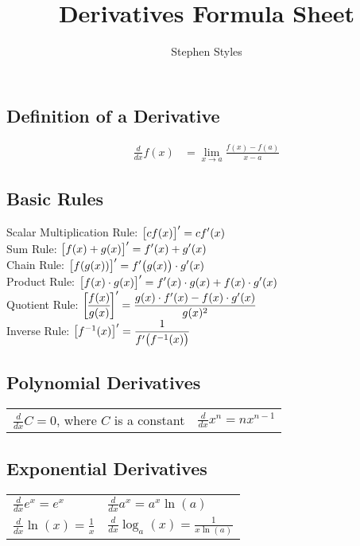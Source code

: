 \documentclass[16pt]{article}
\title{Derivatives Formula Sheet}
\author{Stephen Styles}
\theoremstyle{remark}
\begin{document}
\subsection*{Definition of a Derivative}

\begin{align*}
\frac{d}{dx} f(x) &= \lim_{x\rightarrow a} \frac{f(x)-f(a)}{x-a}
\end{align*}

\subsection*{Basic Rules}

Scalar Multiplication Rule: $\displaystyle{\big{[ c f(x) \big]}' = c f'(x)}$\\

Sum Rule: $\displaystyle{\big{[f(x)+g(x)\big]}' = f'(x) + g'(x) }$\\

Chain Rule: $\displaystyle{ \big{[ f(g(x)) \big]}' = f'\big(g(x)\big)\cdot g'(x) }$\\

Product Rule: $\displaystyle{ \big{[f(x)\cdot g(x)\big]}' = f'(x)\cdot g(x) + f(x) \cdot g'(x) }$\\

Quotient Rule: $\displaystyle{ \bigg{[ \displaystyle{\frac{f(x)}{g(x)}} \bigg]}' = \frac{g(x)\cdot f'(x) - f(x)\cdot g'(x)}{g(x)^2} }$\\

Inverse Rule: $\displaystyle{ \big{[ f^{-1} (x) \big]}' = \frac{1}{f'\big( f^{-1}(x)\big)}}$

\subsection*{Polynomial Derivatives}

\begin{center}
\begin{tabular}{l l}
$\displaystyle{\frac{d}{dx} C = 0}$, where $C$ is a constant & $\displaystyle{\frac{d}{dx} x^n = nx^{n-1}}$
\end{tabular}
\end{center}

\subsection*{Exponential Derivatives}

\begin{center}
\begin{tabular}{l l}
$\displaystyle{\frac{d}{dx} e^x = e^x}$ & $\displaystyle{\frac{d}{dx} a^x = a^x \ln(a)}$\\[3ex]
$\displaystyle{\frac{d}{dx} \ln(x) = \frac{1}{x}}$ & $\displaystyle{\frac{d}{dx} \log_a(x) = \frac{1}{x \ln(a)}}$
\end{tabular}
\end{center} 
\end{document}
